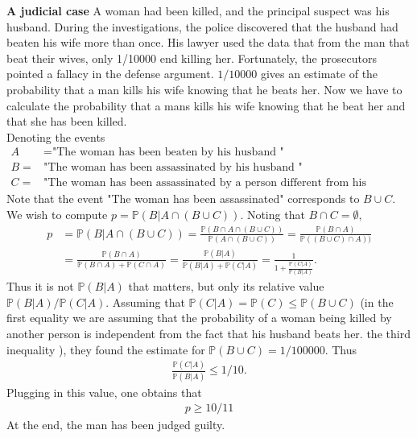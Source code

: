 \documentclass[12pt]{article}
\newcommand{\<}{{\langle \!\! \langle}}
\renewcommand{\>}{{\rangle \!\! \rangle}}
\newcommand{\bel}[2]{\begin{equation} \label{#1} \begin{split} #2
 					\end{split} \end{equation}}
\begin{document}
\textbf{A judicial case} A woman had been killed, and the principal suspect was his husband. During the investigations, the police discovered that the husband had beaten his wife more than once. His lawyer used the data that from the man that beat their wives, only 1/10000 end killing her. Fortunately, the prosecutors pointed a fallacy in the defense argument. $1/10000$ gives an estimate of the probability that a man kills his wife knowing that he beats her. Now we have to calculate the probability that a mans kills his wife knowing that he beat her and that she has been killed.\\
Denoting the events
\bel{}{
A &=\textrm{"The woman has been beaten by his husband  "}\\ B=&\textrm{"The woman has been assassinated by his husband  "} \\ C=&\textrm{"The woman has been assassinated by a person different from his husband "}}
Note that the event "The woman has been assassinated" corresponds to $B\cup C$. We wish to compute 
$p=\mathbb{P}(B\vert A\cap(B\cup C))$. Noting that $B\cap C=\emptyset,$
\bel{}{p& =\mathbb{P}(B\vert A\cap(B\cup C))=\frac{\mathbb{P}(B\cap A\cap (B\cup C))}{\mathbb{P}(A\cap (B\cup C))}=\frac{\mathbb{P}(B\cap A)}{\mathbb{P}((B\cup C)\cap A))}\\
 &=\frac{\mathbb{P}(B\cap A)}{\mathbb{P}(B\cap A)+\mathbb{P}(C\cap A)}=\frac{\mathbb{P}(B|A)}{\mathbb{P}(B|A)+\mathbb{P}(C|A)}=\frac{1}{1+\frac{\mathbb{P}(C|A)}{\mathbb{P}(B|A)}}.}
Thus it is not $\mathbb{P}(B|A)$ that matters, but only its relative value $\mathbb{P}(B|A)/\mathbb{P}(C|A)$. Assuming that $\mathbb{P}(C|A)=\mathbb{P}(C)\leq \mathbb{P}(B\cup C)$ (in the first equality we are assuming that the probability of a woman being killed by another person is independent from the fact that his husband beats her. the third inequality ), they found the estimate for $\mathbb{P}(B\cup C)=1/100000$. Thus \bel{}{\frac{\mathbb{P}(C|A)}{\mathbb{P}(B|A)}\leq 1/10.}
Plugging in this value, one obtains that
\bel{}{p\geq 10/11}
At the end, the man has been judged guilty. 
\end{document}

